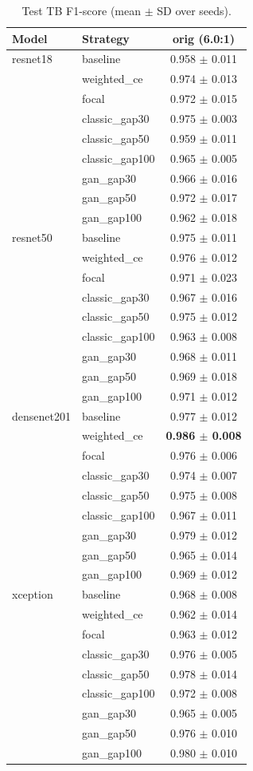 \begin{table}[htbp]
\centering
\caption{Test TB F1-score (mean $\pm$ SD over seeds).}
\label{tab:tb_f1}
\begin{tabular}{llc}
\toprule
Model & Strategy & orig (6.0:1) \\
\midrule
resnet18 & baseline & 0.958 $\pm$ 0.011 \\
 & weighted\_ce & 0.974 $\pm$ 0.013 \\
 & focal & 0.972 $\pm$ 0.015 \\
 & classic\_gap30 & 0.975 $\pm$ 0.003 \\
 & classic\_gap50 & 0.959 $\pm$ 0.011 \\
 & classic\_gap100 & 0.965 $\pm$ 0.005 \\
 & gan\_gap30 & 0.966 $\pm$ 0.016 \\
 & gan\_gap50 & 0.972 $\pm$ 0.017 \\
 & gan\_gap100 & 0.962 $\pm$ 0.018 \\
\addlinespace
resnet50 & baseline & 0.975 $\pm$ 0.011 \\
 & weighted\_ce & 0.976 $\pm$ 0.012 \\
 & focal & 0.971 $\pm$ 0.023 \\
 & classic\_gap30 & 0.967 $\pm$ 0.016 \\
 & classic\_gap50 & 0.975 $\pm$ 0.012 \\
 & classic\_gap100 & 0.963 $\pm$ 0.008 \\
 & gan\_gap30 & 0.968 $\pm$ 0.011 \\
 & gan\_gap50 & 0.969 $\pm$ 0.018 \\
 & gan\_gap100 & 0.971 $\pm$ 0.012 \\
\addlinespace
densenet201 & baseline & 0.977 $\pm$ 0.012 \\
 & weighted\_ce & \textbf{0.986 $\pm$ 0.008} \\
 & focal & 0.976 $\pm$ 0.006 \\
 & classic\_gap30 & 0.974 $\pm$ 0.007 \\
 & classic\_gap50 & 0.975 $\pm$ 0.008 \\
 & classic\_gap100 & 0.967 $\pm$ 0.011 \\
 & gan\_gap30 & 0.979 $\pm$ 0.012 \\
 & gan\_gap50 & 0.965 $\pm$ 0.014 \\
 & gan\_gap100 & 0.969 $\pm$ 0.012 \\
\addlinespace
xception & baseline & 0.968 $\pm$ 0.008 \\
 & weighted\_ce & 0.962 $\pm$ 0.014 \\
 & focal & 0.963 $\pm$ 0.012 \\
 & classic\_gap30 & 0.976 $\pm$ 0.005 \\
 & classic\_gap50 & 0.978 $\pm$ 0.014 \\
 & classic\_gap100 & 0.972 $\pm$ 0.008 \\
 & gan\_gap30 & 0.965 $\pm$ 0.005 \\
 & gan\_gap50 & 0.976 $\pm$ 0.010 \\
 & gan\_gap100 & 0.980 $\pm$ 0.010 \\
\bottomrule
\end{tabular}
\end{table}